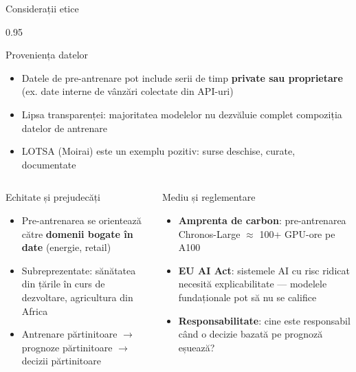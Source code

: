 \documentclass[9pt, aspectratio=169, t]{beamer}
\begin{document}
\begin{frame}{Considerații etice}
    \begin{cminipage}{0.95\textwidth}
    \vspace{-2mm}
    \begin{block}{Proveniența datelor}
        {\small
        \begin{itemize}\setlength{\itemsep}{0pt}
            \item Datele de pre-antrenare pot include serii de timp \textbf{private sau proprietare} (ex. date interne de vânzări colectate din API-uri)
            \item Lipsa transparenței: majoritatea modelelor nu dezvăluie complet compoziția datelor de antrenare
            \item LOTSA (Moirai) este un exemplu pozitiv: surse deschise, curate, documentate
        \end{itemize}
        }
    \end{block}
    \vspace{-2mm}
    \begin{columns}[T]
        \begin{alertblock}{Echitate și prejudecăți}
            {\scriptsize
            \begin{itemize}\setlength{\itemsep}{0pt}
                \item Pre-antrenarea se orientează către \textbf{domenii bogate în date} (energie, retail)
                \item Subreprezentate: sănătatea din țările în curs de dezvoltare, agricultura din Africa
                \item Antrenare părtinitoare $\to$ prognoze părtinitoare $\to$ decizii părtinitoare
            \end{itemize}
            }
        \end{alertblock}

        \begin{alertblock}{Mediu și reglementare}
            {\scriptsize
            \begin{itemize}\setlength{\itemsep}{0pt}
                \item \textbf{Amprenta de carbon}: pre-antrenarea Chronos-Large $\approx$ 100+ GPU-ore pe A100
                \item \textbf{EU AI Act}: sistemele AI cu risc ridicat necesită explicabilitate --- modelele fundaționale pot să nu se califice
                \item \textbf{Responsabilitate}: cine este responsabil când o decizie bazată pe prognoză eșuează?
            \end{itemize}
            }
        \end{alertblock}
    \end{columns}
    \end{cminipage}
\end{frame}
\end{document}
